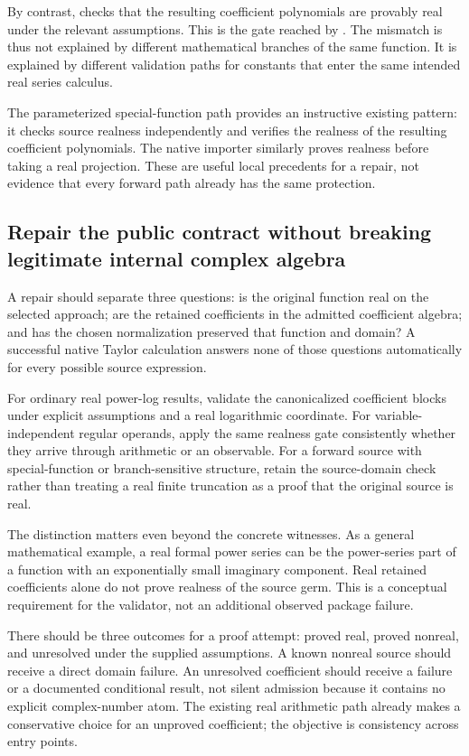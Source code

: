 \documentclass[11pt,letterpaper]{article}
\newcommand{\code}[1]{\texttt{\detokenize{#1}}}
\begin{document}
By contrast, \code{seriesRegularOperand} checks that the resulting coefficient polynomials are provably real under the relevant assumptions. This is the gate reached by \code{SeriesAdd[s, ArcSin[2]]}. The mismatch is thus not explained by different mathematical branches of the same function. It is explained by different validation paths for constants that enter the same intended real series calculus.\cite{repo-arithmetic}

The parameterized special-function path provides an instructive existing pattern: it checks source realness independently and verifies the realness of the resulting coefficient polynomials. The native importer similarly proves realness before taking a real projection. These are useful local precedents for a repair, not evidence that every forward path already has the same protection.\cite{repo-parameterized,repo-native}

\subsection{Repair the public contract without breaking legitimate internal complex algebra}
A repair should separate three questions: is the original function real on the selected approach; are the retained coefficients in the admitted coefficient algebra; and has the chosen normalization preserved that function and domain? A successful native Taylor calculation answers none of those questions automatically for every possible source expression.

For ordinary real power-log results, validate the canonicalized coefficient blocks under explicit assumptions and a real logarithmic coordinate. For variable-independent regular operands, apply the same realness gate consistently whether they arrive through arithmetic or an observable. For a forward source with special-function or branch-sensitive structure, retain the source-domain check rather than treating a real finite truncation as a proof that the original source is real.

The distinction matters even beyond the concrete witnesses. As a general mathematical example, a real formal power series can be the power-series part of a function with an exponentially small imaginary component. Real retained coefficients alone do not prove realness of the source germ. This is a conceptual requirement for the validator, not an additional observed package failure.

There should be three outcomes for a proof attempt: proved real, proved nonreal, and unresolved under the supplied assumptions. A known nonreal source should receive a direct domain failure. An unresolved coefficient should receive a failure or a documented conditional result, not silent admission because it contains no explicit complex-number atom. The existing real arithmetic path already makes a conservative choice for an unproved coefficient; the objective is consistency across entry points.
\end{document}
